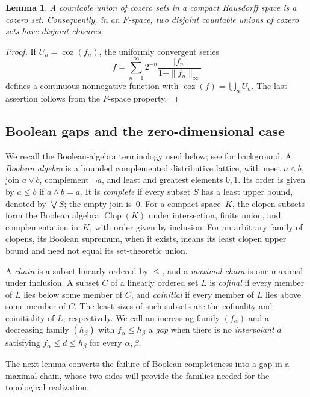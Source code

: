 \documentclass[preprint,12pt,nopreprintline]{elsarticle}
\newtheorem{lemma}[theorem]{Lemma}
\theoremstyle{definition}
\theoremstyle{remark}
\numberwithin{equation}{section}
\begin{document}
\begin{lemma}
\label{tcp:lem:countable-cozero}
A countable union of cozero sets in a compact Hausdorff space is a cozero set. Consequently, in an $F$-space, two disjoint countable unions of cozero sets have disjoint closures.
\end{lemma}

\begin{proof}
If $U_n=\operatorname{coz}(f_n)$, the uniformly convergent series
\[
 f=\sum_{n=1}^\infty 2^{-n}\frac{|f_n|}{1+\|f_n\|_\infty}
\]
defines a continuous nonnegative function with $\operatorname{coz}(f)=\bigcup_n U_n$. The last assertion follows from the $F$-space property.
\end{proof}


\subsection{Boolean gaps and the zero-dimensional case}

We recall the Boolean-algebra terminology used below; see
\cite{Koppelberg} for background. A \emph{Boolean algebra} is a bounded
complemented distributive lattice, with meet $a\wedge b$, join
$a\vee b$, complement $\neg a$, and least and greatest elements
$0,1$. Its order is given by $a\le b$ if $a\wedge b=a$.
It is \emph{complete} if every subset $S$ has a least upper bound,
denoted by $\bigvee S$; the empty join is~$0$.
For a compact space~$K$, the clopen subsets form the Boolean algebra
$\operatorname{Clop}(K)$ under intersection, finite union, and
complementation in~$K$, with order given by inclusion.
For an arbitrary family of clopens, its Boolean supremum, when it
exists, means its least clopen upper bound and need not equal its
set-theoretic union.

A \emph{chain} is a subset linearly ordered by $\le$, and a
\emph{maximal chain} is one maximal under inclusion. A subset $C$
of a linearly ordered set $L$ is \emph{cofinal} if every member of
$L$ lies below some member of $C$, and \emph{coinitial} if every
member of $L$ lies above some member of $C$. The least sizes of such
subsets are the cofinality and coinitiality of $L$, respectively.
We call an increasing family $(f_\alpha)$ and a decreasing family
$(h_\beta)$ with $f_\alpha\le h_\beta$ a \emph{gap} when there is
no \emph{interpolant} $d$ satisfying $f_\alpha\le d\le h_\beta$
for every $\alpha,\beta$.

The next lemma converts the failure of Boolean completeness into a
gap in a maximal chain, whose two sides will provide the families
needed for the topological realization.
\end{document}
